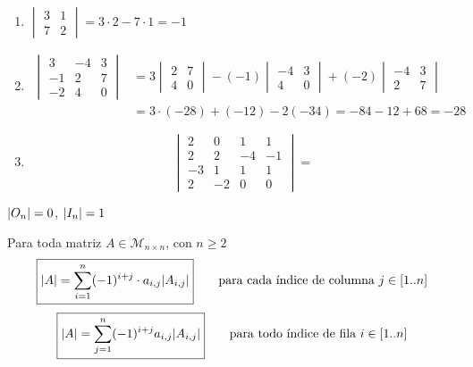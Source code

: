 \documentclass[11pt,a4paper]{article}
\newcommand{\M}{\mathcal{M}}
\begin{document}
\begin{ejemplo}\leavevmode
\begin{enumerate}[label=(\arabic*)]
  \item $\begin{vmatrix}3&1\\7&2\end{vmatrix}=3\cdot2-7\cdot1=-1$
  \item
  \begin{align*}
  \begin{vmatrix}3&-4&3\\-1&2&7\\-2&4&0\end{vmatrix}
  &=3\begin{vmatrix}2&7\\4&0\end{vmatrix}-(-1)\begin{vmatrix}-4&3\\4&0\end{vmatrix}+(-2)\begin{vmatrix}-4&3\\2&7\end{vmatrix}\\
  &=3\cdot(-28)+(-12)-2(-34)=-84-12+68=-28
  \end{align*}
  \item
  \[
  \begin{vmatrix}2&0&1&1\\2&2&-4&-1\\-3&1&1&1\\2&-2&0&0\end{vmatrix}=
  \]
\end{enumerate}
\end{ejemplo}

\begin{ejemplo}
$\lvert O_n\rvert=0$, \qquad $\lvert I_n\rvert=1$
\end{ejemplo}

\begin{proposicion}
Para toda matriz $A\in\M_{n\times n}$, con $n\geq2$
\[
\boxed{\lvert A\rvert=\sum_{i=1}^{n}(-1)^{i+j}\cdot a_{i,j}\lvert A_{i,j}\rvert}\qquad\text{para cada índice de columna } j\in[1..n]
\]
\[
\boxed{\lvert A\rvert=\sum_{j=1}^{n}(-1)^{i+j}a_{i,j}\lvert A_{i,j}\rvert}\qquad\text{para todo índice de fila } i\in[1..n]
\]
\end{proposicion}

\end{document}
